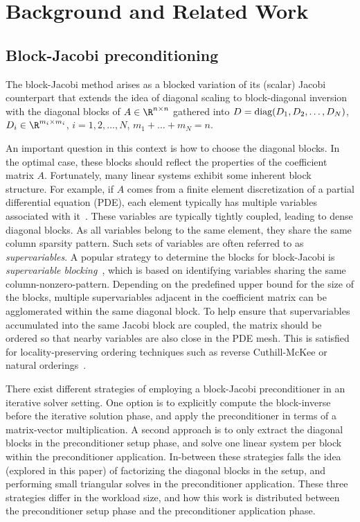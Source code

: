 \section{Background and Related Work}
\label{2017-gh-block-jacobi:sec:s2-background}

\subsection{Block-Jacobi preconditioning}
The block-Jacobi method arises as a
blocked variation of its (scalar) Jacobi counterpart
that extends the idea of diagonal scaling to block-diagonal 
inversion 
with
the diagonal blocks of $A \in \R^{n \times n}$ gathered 
into $D=\mbox{\rm diag}(D_1,D_2,\ldots,D_N)$, $D_i\in \R^{m_i \times m_i}$,
$i=1,2,\ldots,N$,  $m_1 + \ldots + m_N = n$.
 
An important question in this context is how to 
choose the diagonal blocks. In the optimal case, these blocks
should reflect the properties of the coefficient matrix $A$.
Fortunately, many linear systems exhibit some inherent block structure.
For example, if $A$ comes from a finite element
discretization of a partial differential equation (PDE), 
each element typically has multiple variables associated with it~\cite{jenniferscott}.
These variables are typically tightly coupled, 
leading to dense diagonal blocks. 
As all variables belong to the same element, they share the same column sparsity pattern.
Such sets of variables are often referred to as {\it supervariables}.
A popular strategy to determine the blocks for block-Jacobi is 
 {\it supervariable blocking}~\cite{jenniferscott}, which is based on identifying
 variables sharing the same column-nonzero-pattern.
 Depending on the predefined upper bound for the size of the blocks,
 multiple supervariables adjacent in the coefficient matrix 
 can be agglomerated within the same diagonal block.
To help ensure that supervariables accumulated into the same Jacobi block are
coupled, the matrix should be ordered so that
nearby variables are also close in the PDE mesh.
This is satisfied for locality-preserving 
ordering techniques such as reverse Cuthill-McKee or natural orderings~\cite{jenniferscott}.  

There exist different strategies of employing a block-Jacobi preconditioner
in an iterative solver setting.
One option is to explicitly compute the block-inverse before the 
iterative solution phase, and apply the preconditioner in terms of 
a matrix-vector multiplication. 
A second approach is to only extract the diagonal blocks in the preconditioner setup
phase, and solve one linear system per block within the preconditioner application.
In-between these strategies falls the idea (explored in this paper) of factorizing the diagonal blocks in the 
setup, and performing small triangular solves in the preconditioner application.
These three strategies differ in the workload size, and how this work is distributed 
between the preconditioner setup phase and the preconditioner application phase.

